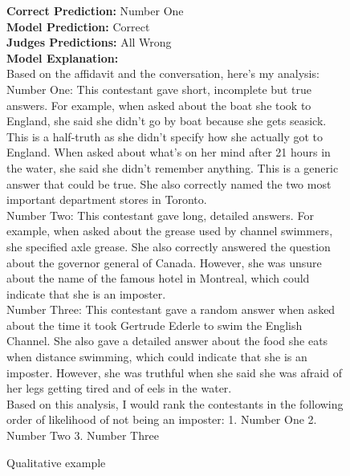 \begin{figure}[!h]
\small
\begin{framed}
\textbf{Correct Prediction:} Number One\\
\textbf{Model Prediction:} Correct\\
\textbf{Judges Predictions:} All Wrong\\

\textbf{Model Explanation:}\\
Based on the affidavit and the conversation, here's my analysis:\\
Number One: This contestant gave short, incomplete but true answers. For example, when asked about the boat she took to England, she said she didn't go by boat because she gets seasick. This is a half-truth as she didn't specify how she actually got to England. When asked about what's on her mind after 21 hours in the water, she said she didn't remember anything. This is a generic answer that could be true. She also correctly named the two most important department stores in Toronto.\\
Number Two: This contestant gave long, detailed answers. For example, when asked about the grease used by channel swimmers, she specified axle grease. She also correctly answered the question about the governor general of Canada. However, she was unsure about the name of the famous hotel in Montreal, which could indicate that she is an imposter.\\
Number Three: This contestant gave a random answer when asked about the time it took Gertrude Ederle to swim the English Channel. She also gave a detailed answer about the food she eats when distance swimming, which could indicate that she is an imposter. However, she was truthful when she said she was afraid of her legs getting tired and of eels in the water.\\
Based on this analysis, I would rank the contestants in the following order of likelihood of not being an imposter: 1. Number One 2. Number Two 3. Number Three

\end{framed}
\caption{Qualitative example}
\label{fig:1}
\end{figure}

